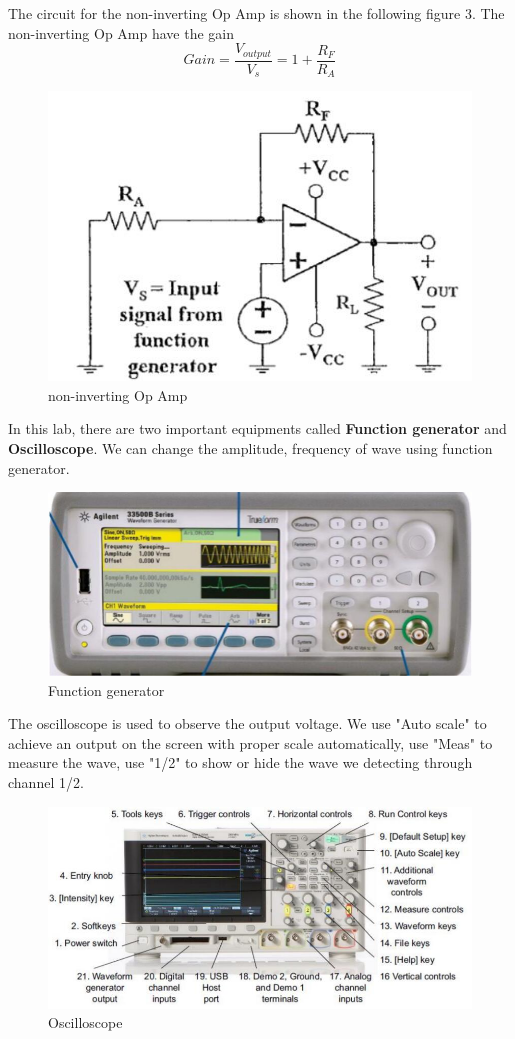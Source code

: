 \documentclass[12pt,a4paper]{article}
\begin{document}
The circuit for the non-inverting Op Amp is shown in the following figure 3. The non-inverting Op Amp have the gain
$$Gain = \frac{V_{output}}{V_s}= 1+\frac{R_F}{R_A}$$
  \begin{figure}[H]
  \centering
  \includegraphics[width=.6\textwidth]{Figure3.jpg}
  \caption{non-inverting Op Amp}
  \label{img} 
\end{figure}

In this lab, there are two important equipments called \textbf{Function generator} and \textbf{Oscilloscope}.
We can change the amplitude, frequency of wave using function generator.
  \begin{figure}[H]
  \centering
  \includegraphics[width=.6\textwidth]{Figure4.jpg}
  \caption{Function generator}
  \label{img} 
\end{figure}
The oscilloscope is used to observe the output voltage. We use "Auto scale" to achieve an output on the screen with proper scale automatically, use "Meas" to measure the wave, use "1/2" to show or hide the wave we detecting through channel 1/2.
  \begin{figure}[H]
  \centering
  \includegraphics[width=.6\textwidth]{Figure5.jpg}
  \caption{Oscilloscope}
  \label{img} 
\end{figure}
\end{document}
